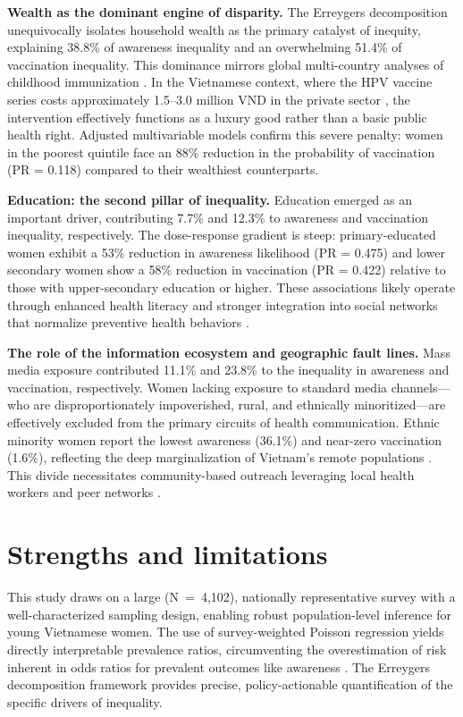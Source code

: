 \textbf{Wealth as the dominant engine of disparity.}
The Erreygers decomposition unequivocally isolates household wealth as the primary catalyst of inequity, explaining 38.8\% of awareness inequality and an overwhelming 51.4\% of vaccination inequality. This dominance mirrors global multi-country analyses of childhood immunization \cite{hosseinpoor2012}. In the Vietnamese context, where the HPV vaccine series costs approximately 1.5--3.0 million VND in the private sector \cite{nguyen2021}, the intervention effectively functions as a luxury good rather than a basic public health right. Adjusted multivariable models confirm this severe penalty: women in the poorest quintile face an 88\% reduction in the probability of vaccination (PR = 0.118) compared to their wealthiest counterparts.

\textbf{Education: the second pillar of inequality.}
Education emerged as an important driver, contributing 7.7\% and 12.3\% to awareness and vaccination inequality, respectively. The dose-response gradient is steep: primary-educated women exhibit a 53\% reduction in awareness likelihood (PR = 0.475) and lower secondary women show a 58\% reduction in vaccination (PR = 0.422) relative to those with upper-secondary education or higher. These associations likely operate through enhanced health literacy and stronger integration into social networks that normalize preventive health behaviors \cite{nutbeam2008}.

\textbf{The role of the information ecosystem and geographic fault lines.}
Mass media exposure contributed 11.1\% and 23.8\% to the inequality in awareness and vaccination, respectively. Women lacking exposure to standard media channels---who are disproportionately impoverished, rural, and ethnically minoritized---are effectively excluded from the primary circuits of health communication. Ethnic minority women report the lowest awareness (36.1\%) and near-zero vaccination (1.6\%), reflecting the deep marginalization of Vietnam's remote populations \cite{pham2020}. This divide necessitates community-based outreach leveraging local health workers and peer networks \cite{wakefield2010}.

\section{Strengths and limitations}

This study draws on a large (N~=~4,102), nationally representative survey with a well-characterized sampling design, enabling robust population-level inference for young Vietnamese women. The use of survey-weighted Poisson regression yields directly interpretable prevalence ratios, circumventing the overestimation of risk inherent in odds ratios for prevalent outcomes like awareness \cite{barros2003}. The Erreygers decomposition framework provides precise, policy-actionable quantification of the specific drivers of inequality.

